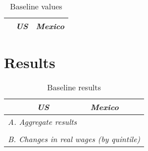 \documentclass[11pt, a4paper]{article}
\begin{document}


\begin{table}[h]
\begin{center}
\caption{Baseline values}
\begin{tabular}{lcc}
\hline \hline
& \textit{US} & \textit{Mexico} \\
\hline

\hline
\end{tabular}
\end{center}
\end{table}


\section{Results}

\begin{table}[h]
\begin{center}
\caption{Baseline results}
\begin{tabular}{lcc}
\hline \hline
& \textit{US} & \textit{Mexico} \\
\hline
\multicolumn{3}{l}{\textit{A. Aggregate results}} \\

\\
\multicolumn{3}{l}{\textit{B. Changes in real wages (by quintile)}} \\

\hline
\end{tabular}
\end{center}
\end{table}
\end{document}
